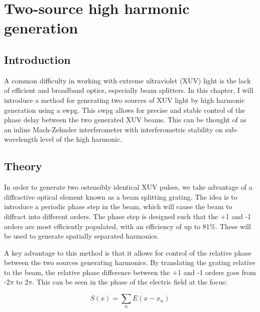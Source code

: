 \chapter{Two-source high harmonic generation}
\label{two_source}

\section{Introduction}
\label{intro_ts}

A common difficulty in working with extreme ultraviolet (XUV) light is the lack of efficient and broadband optics, especially beam splitters. In this chapter, I will introduce a method for generating two sources of XUV light by high harmonic generation using a \gls{swpg}.  This \gls{swpg} allows for precise and stable control of the phase delay between the two generated XUV beams.  This can be thought of as an inline Mach-Zehnder interferometer with interferometric stability on sub-wavelength level of the high harmonic.

\section{Theory}
\label{theory_ts}

In order to generate two ostensibly identical XUV pulses, we take advantage of a diffractive optical element known as a beam splitting grating.   The idea is to introduce a periodic phase step in the beam, which will cause the beam to diffract into different orders.  The phase step is designed such that the +1 and -1 orders are most efficiently populated, with an efficiency of up to 81$\%$.  These will be used to generate spatially separated harmonics.

A key advantage to this method is that it allows for control of the relative phase between the two sources generating harmonics.  By translating the grating relative to the beam, the relative phase difference between the +1 and -1 orders goes from -2$\pi$ to 2$\pi$.  This can be seen in the phase of the electric field at the focus:

\begin{equation}\label{eq:field}
	S(x) = \sum_{n} E(x - x_{n})
\end{equation}

